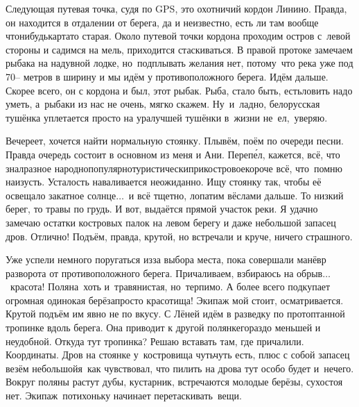 Следующая путевая точка, судя по GPS, это охотничий кордон Линино. Правда, он находится в отдалении от берега, да и неизвестно, есть ли там вообще что\sdash нибудь\mdash карта\sdash то старая. Около путевой точки кордона проходим остров с~левой стороны и садимся на мель, приходится стаскиваться. В правой протоке замечаем рыбака на надувной лодке, но~подплывать желания нет, потому~что река уже под 70\thinspace\nobreakdash-- метров в ширину и мы идём у противоположного берега. Идём дальше. Скорее всего, он с кордона и был, этот рыбак. Рыба, стало быть, есть\mdash ловить надо уметь, а~рыбаки из нас не очень, мягко скажем. Ну~и~ладно, белорусская тушёнка уплетается просто на ура\mdash лучшей тушёнки в~жизни не~ел,~уверяю.

Вечереет, хочется найти нормальную стоянку. Плывём, поём по очереди песни. Правда очередь состоит в основном из меня и Ани. Переп\'{е}л, кажется, всё, что знал\mdash разное народно\sdash популярно\sdash туристически\sdash прикостровое\mdash короче всё, что~помню наизусть. Усталость наваливается неожиданно. Ищу стоянку так, чтобы её освещало закатное солнце$\ldots$~и всё тщетно, лопатим вёслами дальше. То низкий берег, то травы по грудь. И вот, выдаётся прямой участок реки. Я удачно замечаю остатки костровых палок на левом берегу и даже небольшой запасец дров. Отлично! Подъём, правда, крутой, но встречали и круче, ничего страшного.

Уже успели немного поругаться из\sdash за выбора места, пока совершали манёвр разворота от противоположного берега. Причаливаем, взбираюсь на обрыв$\ldots$~красота! Поляна~хоть и~травянистая, но~терпимо. А более всего подкупает огромная одинокая берёза\mdash просто красотища! Экипаж мой стоит, осматривается. Крутой подъём им явно не по вкусу. С Лёней идём в разведку по протоптанной тропинке вдоль берега. Она приводит к другой полянке\mdash гораздо меньшей и неудобной. Откуда тут тропинка? 
\newpage
Решаю вставать там, где причалили. Координаты\mdash \CoordsChagodoschaFifteenKaban. Дров на стоянке у~костровища чуть\sdash чуть есть, плюс с собой запасец везём небольшой\mdash я~как чувствовал, что пилить на дрова тут особо будет и~нечего. Вокруг поляны растут дубы, кустарник, встречаются молодые берёзы, сухостоя нет. Экипаж~потихоньку начинает перетаскивать~вещи. 

